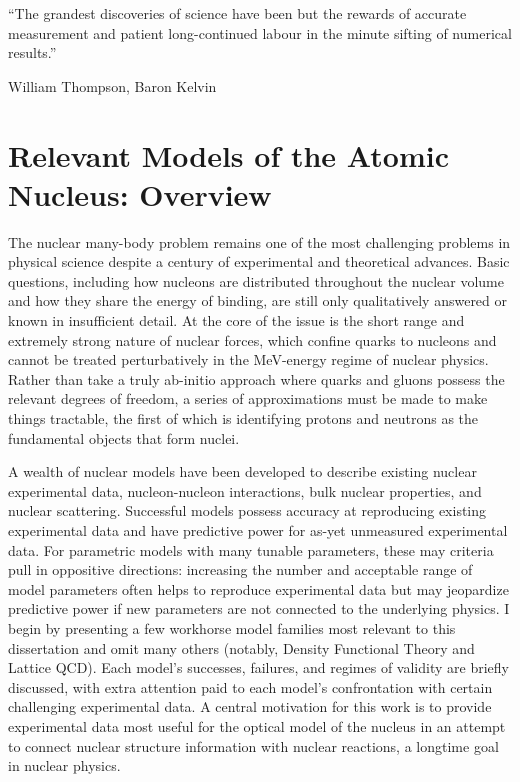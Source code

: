 \epigraph{``The grandest discoveries of science have been but the rewards of
    accurate measurement and patient long-continued labour in the minute
sifting of numerical results.''}{William Thompson,  Baron Kelvin}

\section{Relevant Models of the Atomic Nucleus: Overview}
The nuclear many-body problem remains one of the most challenging problems in
physical science despite a century of experimental and theoretical advances.
Basic questions, including how nucleons are distributed throughout the nuclear
volume and how they share the energy of binding, are still only qualitatively
answered or known in insufficient detail. At the core of the issue is the short
range and extremely strong nature of nuclear forces, which confine
quarks to nucleons and cannot be treated perturbatively in the MeV-energy regime of
nuclear physics. Rather than take a truly ab-initio approach where quarks and gluons
possess the relevant degrees of freedom, a series of approximations must be made
to make things tractable, the first of which is identifying protons and neutrons as
the fundamental objects that form nuclei.

A wealth of nuclear models have been developed to describe existing nuclear
experimental data, nucleon-nucleon interactions, bulk nuclear properties, and
nuclear scattering. Successful models possess accuracy at reproducing existing experimental data
and have predictive power for as-yet unmeasured experimental data. For parametric models
with many tunable parameters, these may criteria pull in oppositive directions:
increasing the number
and acceptable range of model parameters often helps to reproduce experimental data but may
jeopardize predictive power if new parameters are not connected to the underlying physics.
I begin by presenting a few workhorse model families most relevant
to this dissertation and omit many others (notably, Density Functional Theory
and Lattice QCD). Each model's successes,
failures, and regimes of validity are briefly discussed, with extra attention paid
to each model's confrontation with certain challenging experimental data.
A central motivation for this work is to provide experimental data most useful for
the optical model of the nucleus in an attempt to
connect nuclear structure information with nuclear reactions, a longtime goal
in nuclear physics. 

